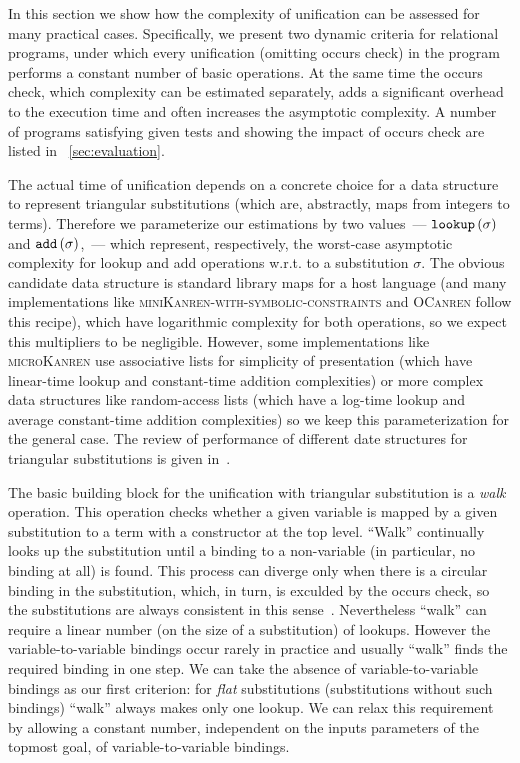 In this section we show how the complexity of unification can be assessed for many practical cases. Specifically, we present two dynamic criteria
for relational programs, under which every unification (omitting occurs check) in the program performs a constant number of basic operations. At the same
time the occurs check, which complexity can be estimated separately, adds a significant overhead to the execution time and often increases the asymptotic complexity.
A number of programs satisfying given tests and showing the impact of occurs check are listed in \sectionword~\ref{sec:evaluation}.

The actual time of unification depends on a concrete choice for a data structure to represent triangular substitutions (which are, abstractly, maps from integers to terms).
Therefore we parameterize our estimations by two values~--- $\texttt{lookup}\,(\sigma)$ and $\texttt{add}\,(\sigma)$,~--- which represent, respectively, the
worst-case asymptotic complexity for lookup and add operations w.r.t. to a substitution $\sigma$. The obvious candidate data structure is standard library maps
for a host language (and many implementations like \textsc{miniKanren-with-symbolic-constraints} and \textsc{OCanren} follow this recipe), which have logarithmic complexity for both operations,
so we expect this multipliers to be negligible. However, some implementations like \textsc{microKanren} use associative lists for simplicity of presentation (which have linear-time
lookup and constant-time addition complexities) or more complex data structures like random-access lists (which have a log-time lookup and average constant-time addition complexities)
so we keep this parameterization for the general case. The review of performance of different date structures for triangular substitutions is given in~\cite{SubstDataStructs}.

The basic building block for the unification with triangular substitution is a \emph{walk} operation. This operation checks whether a given variable is mapped by a given substitution to a
term with a constructor at the top level. ``Walk'' continually looks up the substitution until a binding to a non-variable (in particular, no binding at all) is found. This
process can diverge only when there is a circular binding in the substitution, which, in turn, is exculded by the occurs check, so the substitutions are always consistent
in this sense~\cite{NominalUnificationWithTriangularSubstitutions}. Nevertheless ``walk'' can require a linear number (on the size of a substitution) of lookups.
However the variable-to-variable bindings occur rarely in practice and usually ``walk'' finds the required binding in one step. We can take the absence of variable-to-variable bindings
as our first criterion: for \emph{flat} substitutions (substitutions without such bindings) ``walk'' always makes only one lookup. We can relax this requirement by allowing a
constant number, independent on the inputs parameters of the topmost goal, of variable-to-variable bindings.

